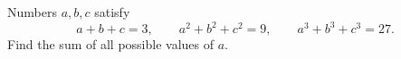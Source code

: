 Numbers $a,b,c$ satisfy
\[a+b+c=3,\qquad a^2+b^2+c^2=9,\qquad a^3+b^3+c^3=27.\]
Find the sum of all possible values of $a$.

